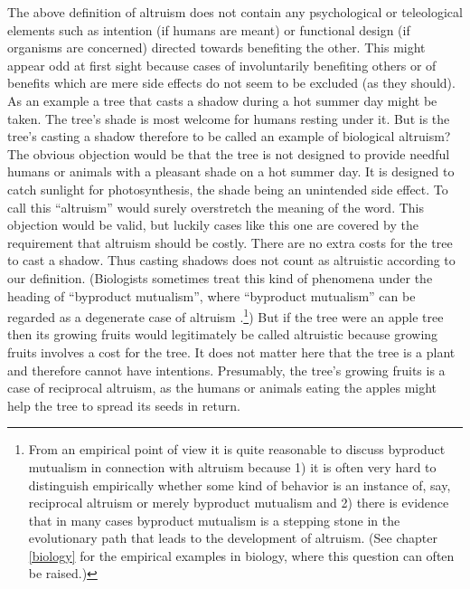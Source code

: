 The above definition of altruism does not contain any psychological or
teleological elements such as intention (if humans are meant) or functional
design (if organisms are concerned) directed towards benefiting the other.
This might appear odd at first sight because cases of involuntarily
benefiting others or of benefits which are mere side effects do not seem to be
excluded (as they should). As an example a tree that casts a shadow during a
hot summer day might be taken. The tree's shade is most welcome for humans
resting under it. But is the tree's casting a shadow therefore to be called an
example of biological altruism? The obvious objection would be that the tree
is not designed to provide needful humans or animals with a pleasant shade on
a hot summer day. It is designed to catch sunlight for photosynthesis, the
shade being an unintended side effect. To call this ``altruism'' would surely
overstretch the meaning of the word. This objection would be valid, but
luckily cases like this one are covered by the requirement that altruism
should be costly. There are no extra costs for the tree to cast a shadow. Thus
casting shadows does not count as altruistic according to our
definition. (Biologists sometimes treat this kind of phenomena under the heading of ``byproduct mutualism'', where ``byproduct mutualism'' can be regarded as a degenerate case of altruism \cite[p.\  42]{dugatkin:1997}.\footnote{From an empirical point of view it is quite reasonable to discuss byproduct mutualism in connection with altruism because 1) it is often very hard to distinguish empirically whether some kind of behavior is an instance of, say, reciprocal altruism or merely byproduct mutualism and 2) there is evidence that in many cases byproduct mutualism is a stepping stone in the evolutionary path that leads to the development of altruism. (See chapter \ref{biology} for the empirical examples
  in biology, where this question can often be raised.)}) But if the tree were
an apple tree then its growing fruits would legitimately be called altruistic
because growing fruits involves a cost for the tree. It does not matter here
that the tree is a plant and therefore cannot have intentions.  Presumably,
the tree's growing fruits is a case of reciprocal altruism, as the humans or
animals eating the apples might help the tree to spread its seeds in return.

